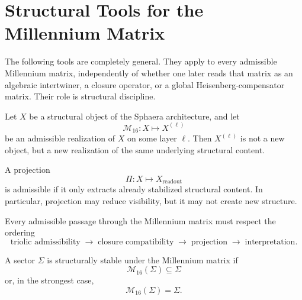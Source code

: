 \section{Structural Tools for the Millennium Matrix}
\label{app:mm-tools}

\begin{remark}
The following tools are completely general. They apply to every admissible
Millennium matrix, independently of whether one later reads that matrix as an
algebraic intertwiner, a closure operator, or a global Heisenberg-compensator
matrix. Their role is structural discipline.
\end{remark}

\begin{definition}
Let $X$ be a structural object of the Sphaera architecture, and let
\[
\mathcal M_{16}: X \mapsto X^{(\ell)}
\]
be an admissible realization of $X$ on some layer $\ell$. Then $X^{(\ell)}$
is not a new object, but a new realization of the same underlying structural
content.
\end{definition}

\begin{definition}
A projection
\[
\Pi: X \mapsto X_{\mathrm{readout}}
\]
is admissible if it only extracts already stabilized structural content. In
particular, projection may reduce visibility, but it may not create new
structure.
\end{definition}

\begin{definition}
Every admissible passage through the Millennium matrix must respect the
ordering
\[
\text{triolic admissibility}
\;\longrightarrow\;
\text{closure compatibility}
\;\longrightarrow\;
\text{projection}
\;\longrightarrow\;
\text{interpretation}.
\]
\end{definition}

\begin{definition}
A sector $\Sigma$ is structurally stable under the Millennium matrix if
\[
\mathcal M_{16}(\Sigma)\subseteq\Sigma
\]
or, in the strongest case,
\[
\mathcal M_{16}(\Sigma)=\Sigma.
\]
\end{definition}

